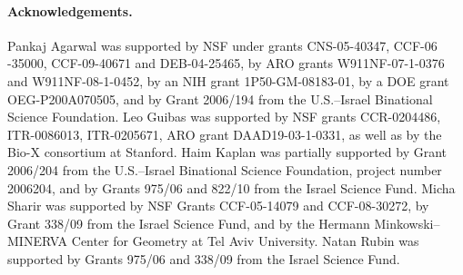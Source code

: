 \documentclass[letter,11pt]{article}
\begin{document}
\paragraph{Acknowledgements.}
{\small Pankaj Agarwal was supported by NSF under grants CNS-05-40347, CCF-06 -35000, CCF-09-40671
               and DEB-04-25465, by ARO grants
               W911NF-07-1-0376 and W911NF-08-1-0452, by an
               NIH grant 1P50-GM-08183-01, by a DOE grant
               OEG-P200A070505, and by Grant 2006/194 from the
                U.S.--Israel Binational Science Foundation.
    Leo Guibas was supported by NSF grants CCR-0204486,
    ITR-0086013, ITR-0205671, ARO grant DAAD19-03-1-0331, as well as by
    the Bio-X consortium at Stanford.
Haim Kaplan was partially supported by Grant 2006/204 from the U.S.--Israel
Binational Science Foundation, project number 2006204, and by Grants 975/06 and 822/10 from
the 
Israel Science Fund.
 Micha Sharir was supported by NSF Grants CCF-05-14079 and CCF-08-30272, 
    by Grant 338/09 from the Israel Science Fund,
    and by the Hermann Minkowski--MINERVA Center for Geometry at Tel
    Aviv University. Natan Rubin was supported by Grants 975/06 and 338/09 from the Israel Science Fund.}
\end{document}
